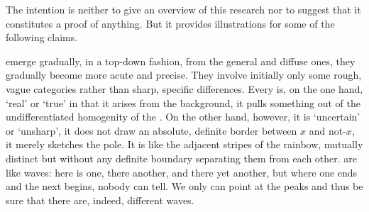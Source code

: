 The intention is neither to give an overview of this research nor to suggest
that it constitutes a proof of anything.   But it provides illustrations
for some of the following claims.
 
\pa\label{pa:norigid}  emerge gradually, in a top-down fashion,
from the general and diffuse ones, they gradually become more acute and precise.
They involve initially only some rough, vague categories rather than sharp,
specific differences.  Every  is, on the one hand, `real' or
`true' in that it arises from the background, it pulls something out of the
undifferentiated homogenity of the . On the other hand, however, it is
`uncertain' or `unsharp', it does not draw an absolute, definite border between
$x$ and not-$x$, it merely sketches the  pole. It is like the
adjacent stripes of the rainbow, mutually distinct but without any definite
boundary separating them from each other.   are like waves:
here is one, there another, and there yet another, but where one ends and the
next begins, nobody can tell. We only can point at the peaks and thus be sure
that there are, indeed, different waves.

